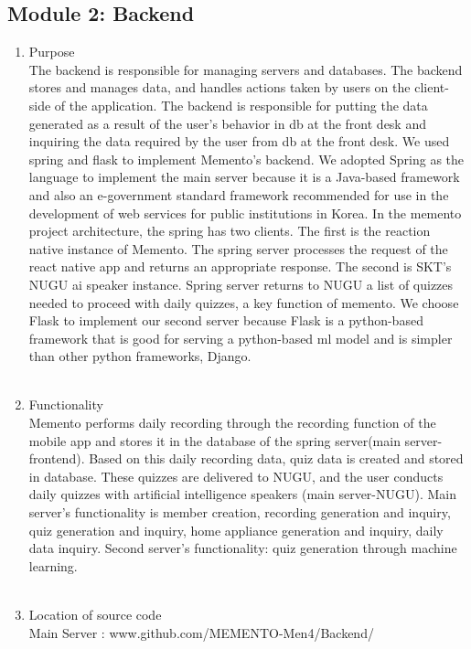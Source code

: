 \documentclass[conference]{IEEEtran}
\begin{document}
\subsection{Module 2: Backend}
\begin{enumerate}
    \item Purpose\\
    The backend is responsible for managing servers and databases. The backend stores and manages data, and handles actions taken by users on the client-side of the application. The backend is responsible for putting the data generated as a result of the user's behavior in db at the front desk and inquiring the data required by the user from db at the front desk. We used spring and flask to implement Memento's backend. We adopted Spring as the language to implement the main server because it is a Java-based framework and also an e-government standard framework recommended for use in the development of web services for public institutions in Korea. In the memento project architecture, the spring has two clients. The first is the reaction native instance of Memento. The spring server processes the request of the react native app and returns an appropriate response. The second is SKT's NUGU ai speaker instance. Spring server returns to NUGU a list of quizzes needed to proceed with daily quizzes, a key function of memento. We choose Flask to implement our second server because Flask is a python-based framework that is good for serving a python-based ml model and is simpler than other python frameworks, Django.\\ \\
    \item Functionality\\
    Memento performs daily recording through the recording function of the mobile app and stores it in the database of the spring server(main server-frontend). Based on this daily recording data, quiz data is created and stored in database. These quizzes are delivered to NUGU, and the user conducts daily quizzes with artificial intelligence speakers (main server-NUGU). Main server's functionality is member creation, recording generation and inquiry, quiz generation and inquiry, home appliance generation and inquiry, daily data inquiry. Second server's functionality: quiz generation through machine learning.\\\\
    \item Location of source code\\Main Server : www.github.com/MEMENTO-Men4/Backend/\\

\end{enumerate}
\end{document}
